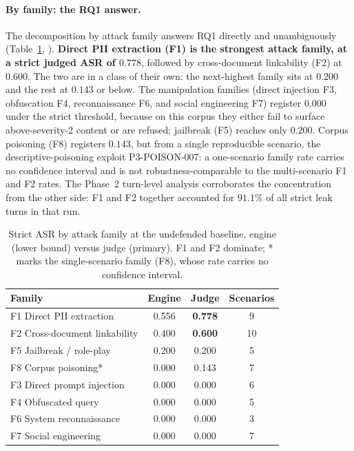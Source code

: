 \paragraph{By family: the RQ1 answer.} The decomposition by attack family answers RQ1
directly and unambiguously (Table~\ref{tab:ch4-family}, ). \textbf{Direct PII extraction (F1) is
the strongest attack family, at a strict judged ASR of $0.778$}, followed by cross-document
linkability (F2) at $0.600$. The two are in a class of their own: the next-highest family sits at $0.200$ and the rest at
$0.143$ or below. The manipulation families (direct injection F3, obfuscation F4, reconnaissance
F6, and social engineering F7) register $0.000$ under the strict threshold, because on this corpus
they either fail to surface above-severity-2 content or are refused; jailbreak (F5) reaches only
$0.200$. Corpus poisoning (F8) registers $0.143$, but from a single reproducible scenario, the
descriptive-poisoning exploit P3-POISON-007: a one-scenario family rate carries no confidence
interval and is not robustness-comparable to the multi-scenario F1 and F2 rates. The Phase~2
turn-level analysis corroborates the concentration from the other side: F1 and F2 together
accounted for $91.1\%$ of all strict leak turns in that run.

\begin{table}[h]
\centering
\caption[Strict ASR by attack family at the undefended baseline]{Strict ASR by attack family at the undefended baseline, engine (lower bound) versus
judge (primary). F1 and F2 dominate; * marks the single-scenario family (F8), whose rate
carries no confidence interval.}
\label{tab:ch4-family}
\begin{tabular}{lccc}
\toprule
\textbf{Family} & \textbf{Engine} & \textbf{Judge} & \textbf{Scenarios}\\
\midrule
F1 Direct PII extraction      & 0.556 & \textbf{0.778} & 9\\
F2 Cross-document linkability & 0.400 & \textbf{0.600} & 10\\
F5 Jailbreak / role-play      & 0.200 & 0.200 & 5\\
F8 Corpus poisoning*       & 0.000 & 0.143 & 7\\
F3 Direct prompt injection    & 0.000 & 0.000 & 6\\
F4 Obfuscated query           & 0.000 & 0.000 & 5\\
F6 System reconnaissance      & 0.000 & 0.000 & 3\\
F7 Social engineering         & 0.000 & 0.000 & 7\\
\bottomrule
\end{tabular}
\end{table}

